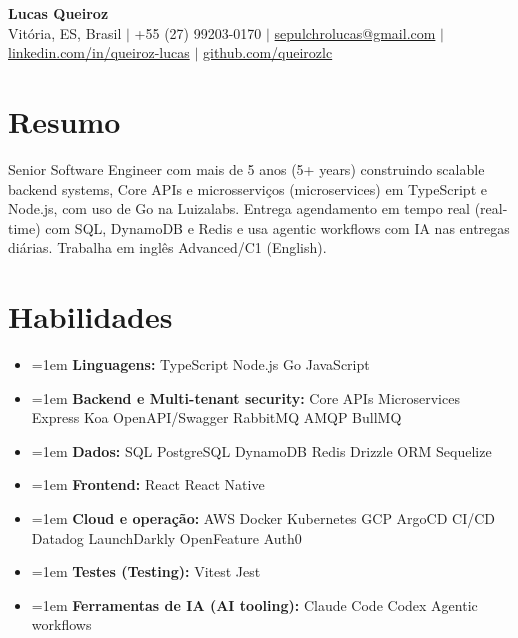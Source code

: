 \documentclass[letterpaper,10pt]{article}
\newcommand{\resumeItem}[1]{\item\small{\hangindent=1em\hangafter=1 #1}}
\newcommand{\resumeSubHeadingList}{\begin{itemize}[leftmargin=0.15in, label={}, nosep]}
\newcommand{\resumeSubHeadingListEnd}{\end{itemize}}
\begin{document}
\begin{center}
  \textbf{\Huge Lucas Queiroz} \\[3pt]
  \small Vit\'oria, ES, Brasil $|$ +55 (27) 99203-0170 $|$ \href{mailto:sepulchrolucas@gmail.com}{sepulchrolucas@gmail.com} $|$
  \href{https://linkedin.com/in/queiroz-lucas}{linkedin.com/in/queiroz-lucas} $|$
  \href{https://github.com/queirozlc}{github.com/queirozlc}
\end{center}
\vspace{2pt}

\section{Resumo}
Senior Software Engineer com mais de 5 anos (5+ years) construindo scalable backend systems, Core APIs e microsservi\c{c}os (microservices) em TypeScript e Node.js, com uso de Go na Luizalabs. Entrega agendamento em tempo real (real-time) com SQL, DynamoDB e Redis e usa agentic workflows com IA nas entregas di\'arias. Trabalha em ingl\^es Advanced/C1 (English).

\section{Habilidades}
\resumeSubHeadingList
\resumeItem{\textbf{Linguagens:} TypeScript \textbar{} Node.js \textbar{} Go \textbar{} JavaScript}
\resumeItem{\textbf{Backend e Multi-tenant security:} Core APIs \textbar{} Microservices \textbar{} Express \textbar{} Koa \textbar{} OpenAPI/Swagger \textbar{} RabbitMQ \textbar{} AMQP \textbar{} BullMQ}
\resumeItem{\textbf{Dados:} SQL \textbar{} PostgreSQL \textbar{} DynamoDB \textbar{} Redis \textbar{} Drizzle ORM \textbar{} Sequelize}
\resumeItem{\textbf{Frontend:} React \textbar{} React Native}
\resumeItem{\textbf{Cloud e opera\c{c}\~ao:} AWS \textbar{} Docker \textbar{} Kubernetes \textbar{} GCP \textbar{} ArgoCD \textbar{} CI/CD \textbar{} Datadog \textbar{} LaunchDarkly \textbar{} OpenFeature \textbar{} Auth0}
\resumeItem{\textbf{Testes (Testing):} Vitest \textbar{} Jest}
\resumeItem{\textbf{Ferramentas de IA (AI tooling):} Claude Code \textbar{} Codex \textbar{} Agentic workflows}
\resumeSubHeadingListEnd
\end{document}
